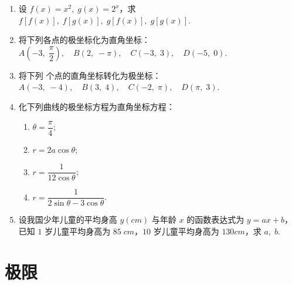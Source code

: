 \begin{enumerate}
    \item 设 $f(x)=x^2,\;g(x)=2^x$，求 $f[f(x)],\;f[g(x)],\;g[f(x)],\;g[g(x)]$.
    
    \item 将下列各点的极坐标化为直角坐标：\\
    $A\left(-3,\;\dfrac{\pi}{2}\right),\quad B(2,\;-\pi),\quad C(-3,\;3),\quad D(-5,\;0)$.

    \item 将下列 个点的直角坐标转化为极坐标：\\
    $A(-3,\;-4),\quad B(3,\;4),\quad C(-2,\;\pi),\quad D(\pi,\;3)$.

    \item 化下列曲线的极坐标方程为直角坐标方程：
    \begin{enumerate}[(1)]\setlength{\itemsep}{5pt}\setlength{\topsep}{15pt}
        \item $\theta=\dfrac{\pi}{4}$;
        \item $r=2a\cos\theta$;
        \item $r=\dfrac{1}{12\cos \theta}$;
        \item $r=\dfrac{1}{2\sin\theta-3\cos\theta}$.
    \end{enumerate}    

    \item 设我国少年儿童的平均身高 $y(cm)$ 与年龄 $x$ 的函数表达式为 $y=ax+b$，
    已知 $1$ 岁儿童平均身高为 $85\;cm$，$10$ 岁儿童平均身高为 $130cm$，求 $a,\;b$.


\end{enumerate}


\section{极限}

